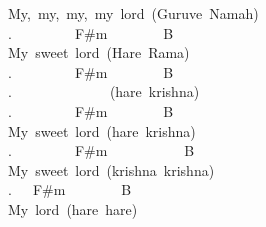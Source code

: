 {My,\ my,\ my,\ my\ lord\ (Guruve\ Namah)\\
.\ \ \ \ \ \ \ \ \ F\#m\ \ \ \ \ \ \ \ B\ \ \ \ \ \ \\
My\ sweet\ lord\ (Hare\ Rama)\\
.\ \ \ \ \ \ \ \ \ F\#m\ \ \ \ \ \ \ \ B\\
.\ \ \ \ \ \ \ \ \ \ \ \ \ \ (hare\ krishna)\\
.\ \ \ \ \ \ \ \ \ F\#m\ \ \ \ \ \ \ \ B\\
My\ sweet\ lord\ (hare\ krishna)\\
.\ \ \ \ \ \ \ \ \ F\#m\ \ \ \ \ \ \ \ \ \ \ B\\
My\ sweet\ lord\ (krishna\ krishna)\\
.\ \ \ F\#m\ \ \ \ \ \ \ \ B\\
My\ lord\ (hare\ hare)\\}
